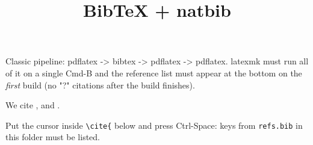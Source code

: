 \documentclass{article}
\title{BibTeX + natbib}
\begin{document}
\maketitle
Classic pipeline: pdflatex -> bibtex -> pdflatex -> pdflatex. latexmk must run all
of it on a single Cmd-B and the reference list must appear at the bottom on the
\emph{first} build (no "?" citations after the build finishes).

We cite \citet{knuth1984}, \citep{lamport1994} and \citep{knuth1984,goossens1994}.

Put the cursor inside \verb|\cite{| below and press Ctrl-Space: keys from
\texttt{refs.bib} in this folder must be listed.

\cite{}



\end{document}
